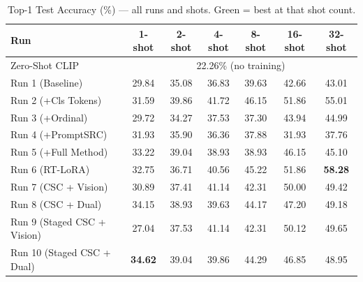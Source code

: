 \documentclass[letterpaper,11pt,leqno]{article}
\begin{document}
\begin{table}[H]
\centering
\caption{Top-1 Test Accuracy (\%) --- all runs and shots.
\colorbox{bestgreen}{Green} = best at that shot count.}
\small
\begin{tabular}{lcccccc}
\toprule
\textbf{Run} & \textbf{1-shot} & \textbf{2-shot} & \textbf{4-shot}
             & \textbf{8-shot} & \textbf{16-shot} & \textbf{32-shot} \\
\midrule
Zero-Shot CLIP  & \multicolumn{6}{c}{22.26\% (no training)} \\
\midrule
Run 1 (Baseline)     & 29.84 & 35.08 & 36.83 & 39.63 & 42.66 & 43.01 \\
Run 2 (+Cls Tokens)  & 31.59 & \cellcolor{bestgreen}39.86
                     & \cellcolor{bestgreen}41.72 & \cellcolor{bestgreen}46.15
                     & \cellcolor{bestgreen}51.86 & 55.01 \\
Run 3 (+Ordinal)     & 29.72 & 34.27 & 37.53 & 37.30 & 43.94 & 44.99 \\
Run 4 (+PromptSRC)   & 31.93 & 35.90 & 36.36 & 37.88
                     & \cellcolor{worstred}31.93 & \cellcolor{worstred}37.76 \\
Run 5 (+Full Method) & 33.22 & 39.04 & 38.93 & 38.93
                     & 46.15 & 45.10 \\
Run 6 (RT-LoRA)      & 32.75 & 36.71 & 40.56 & 45.22
                     & \cellcolor{bestgreen}51.86 & \cellcolor{bestgreen}\textbf{58.28} \\
Run 7 (CSC + Vision) & 30.89 & 37.41 & 41.14 & 42.31
                     & 50.00 & 49.42 \\
Run 8 (CSC + Dual)   & 34.15 & 38.93 & 39.63 & 44.17
                     & 47.20 & 49.18 \\
Run 9 (Staged CSC + Vision) & 27.04 & 37.53 & 41.14 & 42.31
                     & 50.12 & 49.65 \\
Run 10 (Staged CSC + Dual)  & \cellcolor{bestgreen}\textbf{34.62} & 39.04 & 39.86 & 44.29
                     & 46.85 & 48.95 \\
\bottomrule
\end{tabular}
\end{table}
\end{document}
